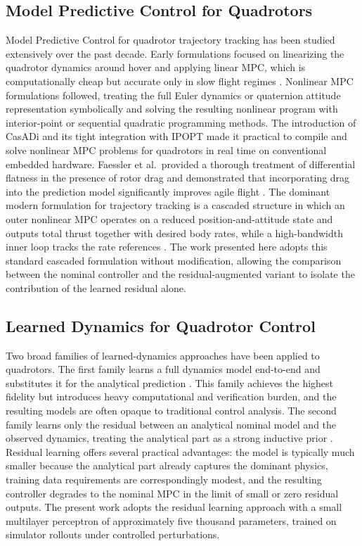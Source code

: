 \documentclass[conference]{IEEEtran}
\begin{document}
\subsection{Model Predictive Control for Quadrotors}
Model Predictive Control for quadrotor trajectory tracking has been studied extensively over the past decade. Early formulations focused on linearizing the quadrotor dynamics around hover and applying linear MPC, which is computationally cheap but accurate only in slow flight regimes \cite{kamel2017linear}. Nonlinear MPC formulations followed, treating the full Euler dynamics or quaternion attitude representation symbolically and solving the resulting nonlinear program with interior-point or sequential quadratic programming methods. The introduction of CasADi \cite{andersson2019casadi} and its tight integration with IPOPT \cite{wachter2006implementation} made it practical to compile and solve nonlinear MPC problems for quadrotors in real time on conventional embedded hardware. Faessler et al.\ provided a thorough treatment of differential flatness in the presence of rotor drag and demonstrated that incorporating drag into the prediction model significantly improves agile flight \cite{faessler2018differential}. The dominant modern formulation for trajectory tracking is a cascaded structure in which an outer nonlinear MPC operates on a reduced position-and-attitude state and outputs total thrust together with desired body rates, while a high-bandwidth inner loop tracks the rate references \cite{faessler2018differential, sun2022comparative}. The work presented here adopts this standard cascaded formulation without modification, allowing the comparison between the nominal controller and the residual-augmented variant to isolate the contribution of the learned residual alone.

\subsection{Learned Dynamics for Quadrotor Control}
Two broad families of learned-dynamics approaches have been applied to quadrotors. The first family learns a full dynamics model end-to-end and substitutes it for the analytical prediction \cite{punjani2015deep, saviolo2022physics, bauersfeld2021neurobem}. This family achieves the highest fidelity but introduces heavy computational and verification burden, and the resulting models are often opaque to traditional control analysis. The second family learns only the residual between an analytical nominal model and the observed dynamics, treating the analytical part as a strong inductive prior \cite{shi2019neural, torrente2021data, salzmann2023real}. Residual learning offers several practical advantages: the model is typically much smaller because the analytical part already captures the dominant physics, training data requirements are correspondingly modest, and the resulting controller degrades to the nominal MPC in the limit of small or zero residual outputs. The present work adopts the residual learning approach with a small multilayer perceptron of approximately five thousand parameters, trained on simulator rollouts under controlled perturbations.
\end{document}
